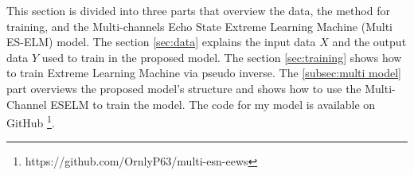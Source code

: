 This section is divided into three parts that overview the data, the method for training, and the Multi-channels Echo State Extreme Learning Machine (Multi ES-ELM) model. The section \ref{sec:data} explains the input data $X$ and the output data $Y$ used to train in the proposed model. The section \ref{sec:training} shows how to train Extreme Learning Machine via pseudo inverse.  The \ref{subsec:multi model} part overviews the proposed model's structure and shows how to use the Multi-Channel ESELM to train the model. The code for my model is available on GitHub \footnote{https://github.com/OrnlyP63/multi-esn-eews}.














